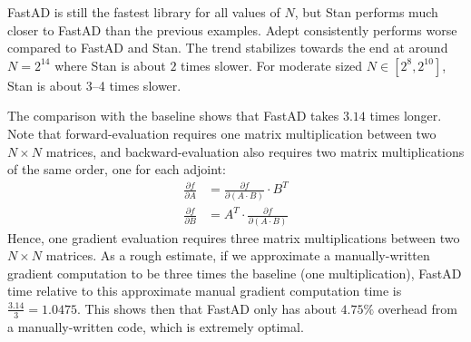 FastAD is still the fastest library for all values of $N$, 
but Stan performs much closer to FastAD than the previous examples.
Adept consistently performs worse compared to FastAD and Stan.
The trend stabilizes towards the end at around $N=2^{14}$ where 
Stan is about $ 2$ times slower.
For moderate sized $N \in [2^{8}, 2^{10}]$, Stan is about 3--4 times slower.

The comparison with the baseline shows that FastAD takes $ 3.14$ times longer.
Note that forward-evaluation requires one matrix multiplication between two $N\times N$ matrices,
and backward-evaluation also requires two matrix multiplications of the same order,
one for each adjoint:
\begin{align*}
    \frac{\partial f}{\partial A} 
    &= \frac{\partial f}{\partial (A\cdot B)} \cdot B^T \\
    \frac{\partial f}{\partial B} 
    &= A^T \cdot \frac{\partial f}{\partial (A\cdot B)}
\end{align*}
Hence, one gradient evaluation requires three matrix multiplications between two $N\times N$ matrices.
As a rough estimate, if we approximate a manually-written gradient computation to be
three times the baseline (one multiplication), FastAD time relative to this approximate manual gradient computation time
is $\frac{3.14}{3} = 1.0475$.
This shows then that FastAD only has about $ 4.75\%$ overhead 
from a manually-written code, which is extremely optimal.
